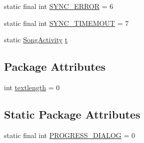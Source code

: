 \begin{DoxyCompactItemize}
\item 
static final int \hyperlink{classcom_1_1axcoto_1_1shinjuku_1_1sushi_1_1_song_activity_a96bf274be6c21e4c855caf513e133426}{\-S\-Y\-N\-C\-\_\-\-E\-R\-R\-O\-R} = 6
\item 
static final int \hyperlink{classcom_1_1axcoto_1_1shinjuku_1_1sushi_1_1_song_activity_ae7a1c41bd61e64a70df3f481b5106160}{\-S\-Y\-N\-C\-\_\-\-T\-I\-M\-E\-M\-O\-U\-T} = 7
\item 
static \hyperlink{classcom_1_1axcoto_1_1shinjuku_1_1sushi_1_1_song_activity}{\-Song\-Activity} \hyperlink{classcom_1_1axcoto_1_1shinjuku_1_1sushi_1_1_song_activity_a252c1917ce0331d17c88e12e2caeb4b3}{t}
\end{DoxyCompactItemize}
\subsection*{\-Package \-Attributes}
\begin{DoxyCompactItemize}
\item 
int \hyperlink{classcom_1_1axcoto_1_1shinjuku_1_1sushi_1_1_song_activity_aac688d92bbcf0a5e9a79ff4a44ac15ef}{textlength} = 0
\end{DoxyCompactItemize}
\subsection*{\-Static \-Package \-Attributes}
\begin{DoxyCompactItemize}
\item 
static final int \hyperlink{classcom_1_1axcoto_1_1shinjuku_1_1sushi_1_1_song_activity_a677c859dfacb01cdb0b5c4866505729a}{\-P\-R\-O\-G\-R\-E\-S\-S\-\_\-\-D\-I\-A\-L\-O\-G} = 0
\end{DoxyCompactItemize}


